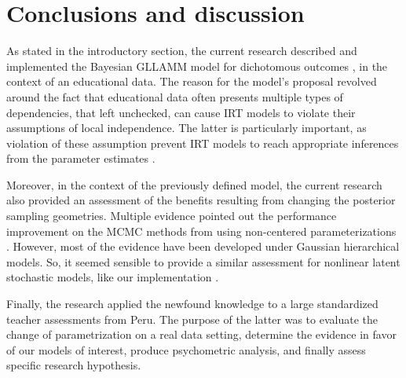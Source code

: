 \chapter{Conclusions and discussion} \label{cap:conclusions}

As stated in the introductory section, the current research described and implemented the Bayesian GLLAMM model for dichotomous outcomes \cite{Rabe_et_al_2004a, Rabe_et_al_2004b, Skrondal_et_al_2004a, Rabe_et_al_2012}, in the context of an educational data. The reason for the model's proposal revolved around the fact that educational data often presents multiple types of dependencies, that left unchecked, can cause IRT models to violate their assumptions of local independence. The latter is particularly important, as violation of these assumption prevent IRT models to reach appropriate inferences from the parameter estimates \cite{Yen_1984, Chen_et_al_1997, Jiao_et_al_2012}.

Moreover, in the context of the previously defined model, the current research also provided an assessment of the benefits resulting from changing the posterior sampling geometries. Multiple evidence pointed out the performance improvement on the MCMC methods from using non-centered parameterizations \cite{Gelfand_et_al_1995, Gelfand_et_al_1996, Papaspiliopoulos_et_al_2003, Papaspiliopoulos_et_al_2007, Betancourt_et_al_2013}. However, most of the evidence have been developed under Gaussian hierarchical models. So, it seemed sensible to provide a similar assessment for nonlinear latent stochastic models, like our implementation \cite{Papaspiliopoulos_et_al_2007}.

Finally, the research applied the newfound knowledge to a large standardized teacher assessments from Peru. The purpose of the latter was to evaluate the change of parametrization on a real data setting, determine the evidence in favor of our models of interest, produce psychometric analysis, and finally assess specific research hypothesis. \\

